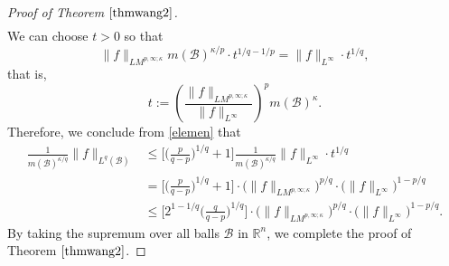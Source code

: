 \documentclass{birkjour}
\theoremstyle{definition}
\theoremstyle{remark}
\numberwithin{equation}{section}
\begin{document}
\begin{proof}[Proof of Theorem $\ref{thmwang2}$]
\begin{equation*}
\begin{split}
\end{split}
\end{equation*}
We can choose $t>0$ so that
\begin{equation*}
\|f\|_{LM^{p,\infty;\kappa}}m(\mathcal{B})^{\kappa/p}\cdot t^{1/q-1/p}=\|f\|_{L^\infty}\cdot t^{1/q},
\end{equation*}
that is,
\begin{equation*}
t:=\left(\frac{\|f\|_{LM^{p,\infty;\kappa}}}{\|f\|_{L^\infty}}\right)^pm(\mathcal{B})^{\kappa}.
\end{equation*}
Therefore, we conclude from \eqref{elemen} that
\begin{equation*}
\begin{split}
\frac{1}{m(\mathcal{B})^{\kappa/q}}\|f\|_{L^{q}(\mathcal{B})}
&\leq\Big[\Big(\frac{p}{q-p}\Big)^{1/q}+1\Big]\frac{1}{m(\mathcal{B})^{\kappa/q}}\|f\|_{L^\infty}\cdot t^{1/q}\\
&=\Big[\Big(\frac{p}{q-p}\Big)^{1/q}+1\Big]
\cdot\big(\|f\|_{LM^{p,\infty;\kappa}}\big)^{p/q}\cdot\big(\|f\|_{L^\infty}\big)^{1-p/q}\\
&\leq \Big[2^{1-1/q}\Big(\frac{q}{q-p}\Big)^{1/q}\Big]
\cdot\big(\|f\|_{LM^{p,\infty;\kappa}}\big)^{p/q}\cdot\big(\|f\|_{L^\infty}\big)^{1-p/q}.
\end{split}
\end{equation*}
By taking the supremum over all balls $\mathcal{B}$ in $\mathbb R^n$, we complete the proof of Theorem $\ref{thmwang2}$.
\end{proof}
\end{document}

